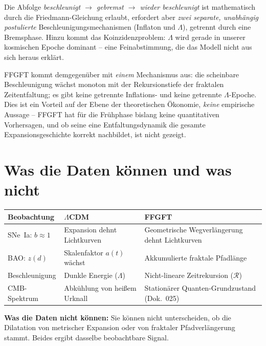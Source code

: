 Die Abfolge \emph{beschleunigt $\to$ gebremst $\to$ wieder beschleunigt} ist
mathematisch durch die Friedmann-Gleichung erlaubt, erfordert aber
\emph{zwei separate, unabhängig postulierte} Beschleunigungsmechanismen
(Inflaton und $\Lambda$), getrennt durch eine Bremsphase. Hinzu kommt das
Koinzidenzproblem: $\Lambda$ wird gerade in unserer kosmischen Epoche
dominant -- eine Feinabstimmung, die das Modell nicht aus sich heraus
erklärt.

FFGFT kommt demgegenüber mit \emph{einem} Mechanismus aus: die scheinbare
Beschleunigung wächst monoton mit der Rekursionstiefe der fraktalen
Zeitentfaltung; es gibt keine getrennte Inflations- und keine getrennte
$\Lambda$-Epoche. Dies ist ein Vorteil auf der Ebene der theoretischen
Ökonomie, \emph{keine} empirische Aussage -- FFGFT hat für die Frühphase
bislang keine quantitativen Vorhersagen, und ob seine eine
Entfaltungsdynamik die gesamte Expansionsgeschichte korrekt nachbildet, ist
nicht gezeigt.

\section{Was die Daten können und was nicht}

\begin{center}
\begin{tabular}{p{3cm}p{4.3cm}p{4.3cm}}
\toprule
\textbf{Beobachtung} & \textbf{$\Lambda$CDM} & \textbf{FFGFT} \\
\midrule
SNe~Ia: $b \approx 1$ &
  Expansion dehnt Lichtkurven &
  Geometrische Wegverlängerung dehnt Lichtkurven \\
\addlinespace
BAO: $z(d)$ &
  Skalenfaktor $a(t)$ wächst &
  Akkumulierte fraktale Pfadlänge \\
\addlinespace
Beschleunigung &
  Dunkle Energie ($\Lambda$) &
  Nicht-lineare Zeitrekursion ($\mathcal{R}$) \\
\addlinespace
CMB-Spektrum &
  Abkühlung von heißem Urknall &
  Stationärer Quanten-Grundzustand (Dok.~025) \\
\bottomrule
\end{tabular}
\end{center}

\textbf{Was die Daten nicht können:} Sie können nicht unterscheiden, ob die
Dilatation von metrischer Expansion oder von fraktaler Pfadverlängerung
stammt. Beides ergibt dasselbe beobachtbare Signal.

